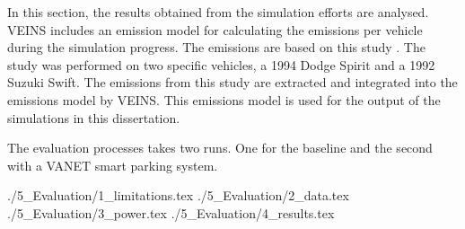 In this section, the results obtained from the simulation efforts are analysed. \ac{VEINS} includes an emission model for calculating the emissions per vehicle during the simulation progress. The emissions are based on this study \citep{Cappiello2002AConsumption}. The study was performed on two specific vehicles, a 1994 Dodge Spirit and a 1992 Suzuki Swift. The emissions from this study are extracted and integrated into the emissions model by \ac{VEINS}. This emissions model is used for the output of the simulations in this dissertation.

The evaluation processes takes two runs. One for the baseline and the second with a VANET smart parking system.

{./5_Evaluation/1_limitations.tex}
{./5_Evaluation/2_data.tex}
{./5_Evaluation/3_power.tex}
{./5_Evaluation/4_results.tex}

